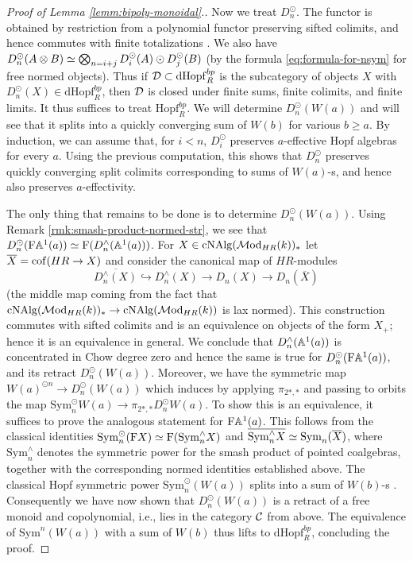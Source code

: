 \documentclass{amsart}
\numberwithin{proposition}{section}
\numberwithin{equation}{section}
\def\Sym{\mathrm{Sym}}
\def\Hopf{\mathrm{Hopf}}
\def\dHopf{\mathrm{dHopf}}
\def\Hopf{\mathrm{Hopf}}
\def\cNAlg{\mathrm{cNAlg}}
\def\Free{\mathrm{F}}
\def\hotimes{\odot}
\begin{document}
\begin{proof}[Proof of Lemma \ref{lemm:bipoly-monoidal}.]
Now we treat $D_n^\hotimes$.
The functor is obtained by restriction from a polynomial functor preserving sifted colimits, and hence commutes with finite totalizations \cite[Proposition 2.15]{k-theory-and-poly-functors}.
We also have $D_n^\hotimes(A \otimes B) \wequi \bigotimes_{n = i+j}D_i^\hotimes(A) \hotimes D_j^\hotimes(B)$ (by the formula \eqref{eq:formula-for-nsym} for free normed objects).
Thus if $\scr D \subset \dHopf_R^{bp}$ is the subcategory of objects $X$ with $D_n^\hotimes(X) \in \dHopf_R^{bp}$, then $\mathcal D$ is closed under finite sums, finite colimits, and finite limits.
It thus suffices to treat $\Hopf_R^{bp}$.
We will determine $D_n^\hotimes(W(a))$ and will see that it splits into a quickly converging sum of $W(b)$ for various $b \ge a$.
By induction, we can assume that, for $i<n$, $D_i^\hotimes$ preserves $a$-effective Hopf algebras for every $a$.
Using the previous computation, this shows that $D_n^\hotimes$ preserves quickly converging split colimits corresponding to sums of $W(a)$-s, and hence also preserves $a$-effectivity.

The only thing that remains to be done is to determine $D_n^\hotimes(W(a))$.
Using Remark \ref{rmk:smash-product-normed-str}, we see that $D_n^\hotimes(\Free\A^1(a)) \wequi \Free(D_n^\wedge(\A^1(a)))$.
For $X \in \cNAlg(\Mod_{HR}(k))_*$ let $\overline{X} = \operatorname{cof}(HR \to X)$ and consider the canonical map of $HR$-modules \[ \overline{D_n^\wedge(X)} \hookrightarrow D_n^\wedge(X) \to D_n(X) \to D_n(\overline{X}) \] (the middle map coming from the fact that $\cNAlg(\Mod_{HR}(k))_* \to \cNAlg(\Mod_{HR}(k))$ is lax normed).
This construction commutes with sifted colimits and is an equivalence on objects of the form $X_+$; hence it is an equivalence in general.
We conclude that $D_n^\wedge(\mathbb A^1(a))$ is concentrated in Chow degree zero and hence the same is true for $D_n^\hotimes(\Free\A^1(a))$, and its retract $D_n^\hotimes(W(a))$.
Moreover, we have the symmetric map $W(a)^{\hotimes n} \to D_n^\hotimes(W(a))$ which induces by applying $\pi_{2*,*}$ and passing to orbits the map $\Sym_n^\hotimes W(a) \to \pi_{2*,*} D_n^\hotimes W(a)$.
To show this is an equivalence, it suffices to prove the analogous statement for $\Free\A^1(a)$.
This follows from the classical identities $\Sym_n^\hotimes(\Free X) \wequi \Free(\Sym_n^\wedge X)$ and $\overline{\Sym_n^\wedge X} \wequi \Sym_n(\overline X)$, where $\Sym_n^\wedge$ denotes the symmetric power for the smash product of pointed coalgebras, together with the corresponding normed identities established above.
The classical Hopf symmetric power $\Sym_n^\hotimes(W(a))$ splits into a sum of $W(b)$-s \cite[Proposition~2.44, Example~2.46, and Remark~4.36]{bachmann-wilson}.
Consequently we have now shown that $D_n^\hotimes(W(a))$ is a retract of a free monoid and copolynomial, i.e., lies in the category $\mathcal C$ from above.
The equivalence of $\Sym^n(W(a))$ with a sum of $W(b)$ thus lifts to $\dHopf_R^{bp}$, concluding the proof.
\end{proof}
\end{document}

